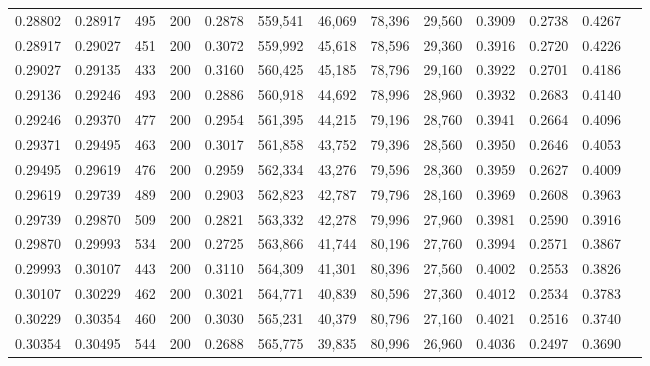 \begin{tabular}{rrrrrrrrrrrrr}
0.28802 & 0.28917 &   495 & 200 &                                     0.2878 & 559,541 &  46,069 &  78,396 &  29,560 & 0.3909 & 0.2738 & 0.4267 \\
0.28917 & 0.29027 &   451 & 200 &                                     0.3072 & 559,992 &  45,618 &  78,596 &  29,360 & 0.3916 & 0.2720 & 0.4226 \\
0.29027 & 0.29135 &   433 & 200 &                                     0.3160 & 560,425 &  45,185 &  78,796 &  29,160 & 0.3922 & 0.2701 & 0.4186 \\
0.29136 & 0.29246 &   493 & 200 &                                     0.2886 & 560,918 &  44,692 &  78,996 &  28,960 & 0.3932 & 0.2683 & 0.4140 \\
0.29246 & 0.29370 &   477 & 200 &                                     0.2954 & 561,395 &  44,215 &  79,196 &  28,760 & 0.3941 & 0.2664 & 0.4096 \\
0.29371 & 0.29495 &   463 & 200 &                                     0.3017 & 561,858 &  43,752 &  79,396 &  28,560 & 0.3950 & 0.2646 & 0.4053 \\
0.29495 & 0.29619 &   476 & 200 &                                     0.2959 & 562,334 &  43,276 &  79,596 &  28,360 & 0.3959 & 0.2627 & 0.4009 \\
0.29619 & 0.29739 &   489 & 200 &                                     0.2903 & 562,823 &  42,787 &  79,796 &  28,160 & 0.3969 & 0.2608 & 0.3963 \\
0.29739 & 0.29870 &   509 & 200 &                                     0.2821 & 563,332 &  42,278 &  79,996 &  27,960 & 0.3981 & 0.2590 & 0.3916 \\
0.29870 & 0.29993 &   534 & 200 &                                     0.2725 & 563,866 &  41,744 &  80,196 &  27,760 & 0.3994 & 0.2571 & 0.3867 \\
0.29993 & 0.30107 &   443 & 200 &                                     0.3110 & 564,309 &  41,301 &  80,396 &  27,560 & 0.4002 & 0.2553 & 0.3826 \\
0.30107 & 0.30229 &   462 & 200 &                                     0.3021 & 564,771 &  40,839 &  80,596 &  27,360 & 0.4012 & 0.2534 & 0.3783 \\
0.30229 & 0.30354 &   460 & 200 &                                     0.3030 & 565,231 &  40,379 &  80,796 &  27,160 & 0.4021 & 0.2516 & 0.3740 \\
0.30354 & 0.30495 &   544 & 200 &                                     0.2688 & 565,775 &  39,835 &  80,996 &  26,960 & 0.4036 & 0.2497 & 0.3690 \\

\end{tabular}
